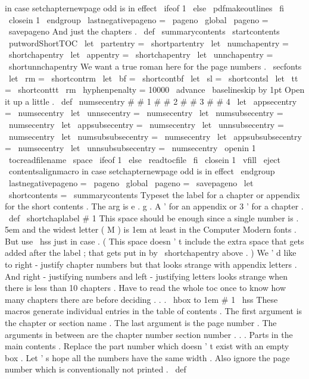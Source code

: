 {{{{in
case
setchapternewpage
odd
is
in
effect
\
ifeof
1
\
else
\
pdfmakeoutlines
\
fi
\
closein
1
\
endgroup
\
lastnegativepageno
=
\
pageno
\
global
\
pageno
=
\
savepageno
}
%
And
just
the
chapters
.
\
def
\
summarycontents
{
%
\
startcontents
{
\
putwordShortTOC
}
%
%
\
let
\
partentry
=
\
shortpartentry
\
let
\
numchapentry
=
\
shortchapentry
\
let
\
appentry
=
\
shortchapentry
\
let
\
unnchapentry
=
\
shortunnchapentry
%
We
want
a
true
roman
here
for
the
page
numbers
.
\
secfonts
\
let
\
rm
=
\
shortcontrm
\
let
\
bf
=
\
shortcontbf
\
let
\
sl
=
\
shortcontsl
\
let
\
tt
=
\
shortconttt
\
rm
\
hyphenpenalty
=
10000
\
advance
\
baselineskip
by
1pt
%
Open
it
up
a
little
.
\
def
\
numsecentry
#
#
1
#
#
2
#
#
3
#
#
4
{
}
\
let
\
appsecentry
=
\
numsecentry
\
let
\
unnsecentry
=
\
numsecentry
\
let
\
numsubsecentry
=
\
numsecentry
\
let
\
appsubsecentry
=
\
numsecentry
\
let
\
unnsubsecentry
=
\
numsecentry
\
let
\
numsubsubsecentry
=
\
numsecentry
\
let
\
appsubsubsecentry
=
\
numsecentry
\
let
\
unnsubsubsecentry
=
\
numsecentry
\
openin
1
\
tocreadfilename
\
space
\
ifeof
1
\
else
\
readtocfile
\
fi
\
closein
1
\
vfill
\
eject
\
contentsalignmacro
%
in
case
setchapternewpage
odd
is
in
effect
\
endgroup
\
lastnegativepageno
=
\
pageno
\
global
\
pageno
=
\
savepageno
}
\
let
\
shortcontents
=
\
summarycontents
%
Typeset
the
label
for
a
chapter
or
appendix
for
the
short
contents
.
%
The
arg
is
e
.
g
.
A
'
for
an
appendix
or
3
'
for
a
chapter
.
%
\
def
\
shortchaplabel
#
1
{
%
%
This
space
should
be
enough
since
a
single
number
is
.
5em
and
the
%
widest
letter
(
M
)
is
1em
at
least
in
the
Computer
Modern
fonts
.
%
But
use
\
hss
just
in
case
.
%
(
This
space
doesn
'
t
include
the
extra
space
that
gets
added
after
%
the
label
;
that
gets
put
in
by
\
shortchapentry
above
.
)
%
%
We
'
d
like
to
right
-
justify
chapter
numbers
but
that
looks
strange
%
with
appendix
letters
.
And
right
-
justifying
numbers
and
%
left
-
justifying
letters
looks
strange
when
there
is
less
than
10
%
chapters
.
Have
to
read
the
whole
toc
once
to
know
how
many
chapters
%
there
are
before
deciding
.
.
.
\
hbox
to
1em
{
#
1
\
hss
}
%
}
%
These
macros
generate
individual
entries
in
the
table
of
contents
.
%
The
first
argument
is
the
chapter
or
section
name
.
%
The
last
argument
is
the
page
number
.
%
The
arguments
in
between
are
the
chapter
number
section
number
.
.
.
%
Parts
in
the
main
contents
.
Replace
the
part
number
which
doesn
'
t
%
exist
with
an
empty
box
.
Let
'
s
hope
all
the
numbers
have
the
same
width
.
%
Also
ignore
the
page
number
which
is
conventionally
not
printed
.
\
def
}}}
